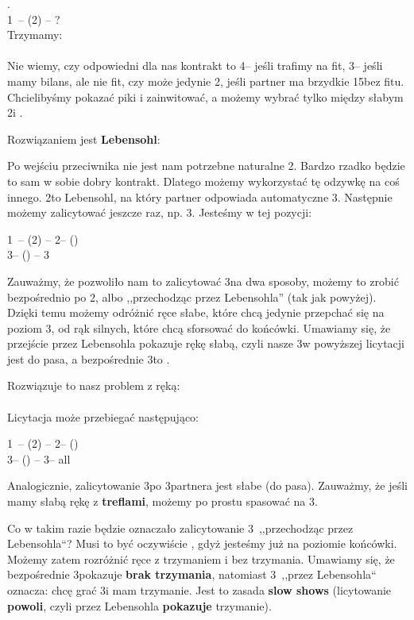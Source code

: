 \documentclass[12pt, a4paper]{article}
\begin{document}
\vspace{0.3cm}
.\\
1\nt\ -- (2\hearts) -- ?\\
Trzymamy:\\
\\
Nie wiemy, czy odpowiedni dla nas kontrakt to
4\spades -- jeśli trafimy na fit, 3\nt -- jeśli mamy bilans, ale nie fit, czy może jedynie 2\spades,
jeśli partner ma brzydkie 15\hcp bez fitu. Chcielibyśmy pokazać piki i zainwitować, 
a możemy wybrać tylko między słabym 2\spades i \spades.

\vspace{0.5cm}
\noindent
Rozwiązaniem jest 
\textbf{{\color{red}L}{\color{orange}e}{\color{LimeGreen}b}{\color{cyan}e}{\color{blue}n}{\color{purple}s}{\color{red}o}{\color{orange}h}{\color{LimeGreen}l}}:


Po wejściu przeciwnika nie jest nam potrzebne naturalne 2\nt. Bardzo rzadko będzie to 
sam w sobie dobry kontrakt. Dlatego możemy wykorzystać tę odzywkę na coś innego.
2\nt to Lebensohl, na który partner odpowiada automatyczne 3\clubs. Następnie możemy zalicytować
jeszcze raz, np. 3\hearts. Jesteśmy w tej pozycji:

    1\nt\ -- (2\spades) -- 2\nt -- (\pass)\\
    3\clubs -- (\pass) -- 3\hearts

Zauważmy, że pozwoliło nam to zalicytować 3\hearts na dwa sposoby, możemy to zrobić bezpośrednio
po 2\spades,
albo ,,przechodząc przez Lebensohla'' (tak jak powyżej). Dzięki temu możemy odróżnić ręce słabe,
które chcą jedynie przepchać się na poziom 3, od rąk silnych, które chcą sforsować do końcówki.
Umawiamy się, że przejście przez Lebensohla pokazuje rękę słabą, czyli nasze 3\hearts w powyższej licytacji
jest do pasa, a bezpośrednie 3\hearts to \gf.

Rozwiązuje to nasz problem z ręką:\\
\\
Licytacja może przebiegać następująco:

1\nt\ -- (2\spades) -- 2\nt -- (\pass)\\
3\clubs -- (\pass) -- 3\hearts -- all \pass

Analogicznie, zalicytowanie 3\diams po 3\clubs partnera jest słabe (do pasa).
Zauważmy, że jeśli mamy słabą rękę z \textbf{treflami}, możemy po prostu spasować na 3\clubs.

Co w takim razie będzie oznaczało zalicytowanie 3\nt\ ,,przechodząc przez Lebensohla``?
Musi to być oczywiście \gf, gdyż jesteśmy już na poziomie końcówki. Możemy zatem rozróżnić ręce
z trzymaniem i bez trzymania. Umawiamy się, że bezpośrednie 3\nt pokazuje \textbf{brak trzymania},
natomiast 3\nt\ ,,przez Lebensohla`` oznacza: chcę grać 3\nt i mam trzymanie. Jest to zasada 
\textbf{slow shows} (licytowanie \textbf{powoli}, czyli przez Lebensohla \textbf{pokazuje} trzymanie).
\end{document}
